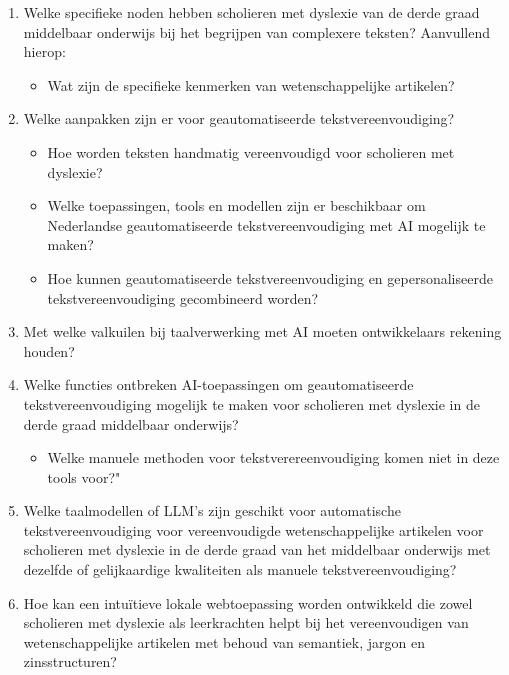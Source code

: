 \begin{enumerate}
	\item Welke specifieke noden hebben scholieren met dyslexie van de derde graad middelbaar onderwijs bij het begrijpen van complexere teksten? Aanvullend hierop: 
	\begin{itemize}
		\item Wat zijn de specifieke kenmerken van wetenschappelijke artikelen?
	\end{itemize} 
	\item Welke aanpakken zijn er voor geautomatiseerde tekstvereenvoudiging?
	\begin{itemize}
		\item Hoe worden teksten handmatig vereenvoudigd voor scholieren met dyslexie?
		\item Welke toepassingen, tools en modellen zijn er beschikbaar om Nederlandse geautomatiseerde tekstvereenvoudiging met AI mogelijk te maken?
		\item Hoe kunnen geautomatiseerde tekstvereenvoudiging en gepersonaliseerde tekstvereenvoudiging gecombineerd worden?
	\end{itemize}
	\item Met welke valkuilen bij taalverwerking met AI moeten ontwikkelaars rekening houden?
	\item Welke functies ontbreken AI-toepassingen om geautomatiseerde tekstvereenvoudiging mogelijk te maken voor scholieren met dyslexie in de derde graad middelbaar onderwijs? 
	\begin{itemize}
		\item Welke manuele methoden voor tekstverereenvoudiging komen niet in deze tools voor?"
	\end{itemize}
	\item Welke taalmodellen of LLM's zijn geschikt voor automatische tekstvereenvoudiging voor vereenvoudigde wetenschappelijke artikelen voor scholieren met dyslexie in de derde graad van het middelbaar onderwijs met dezelfde of gelijkaardige kwaliteiten als manuele tekstvereenvoudiging?
	\item Hoe kan een intuïtieve lokale webtoepassing worden ontwikkeld die zowel scholieren met dyslexie als leerkrachten helpt bij het vereenvoudigen van wetenschappelijke artikelen met behoud van semantiek, jargon en zinsstructuren?
\end{enumerate}


\section{}%
\label{sec:onderzoeksdoelstelling}

